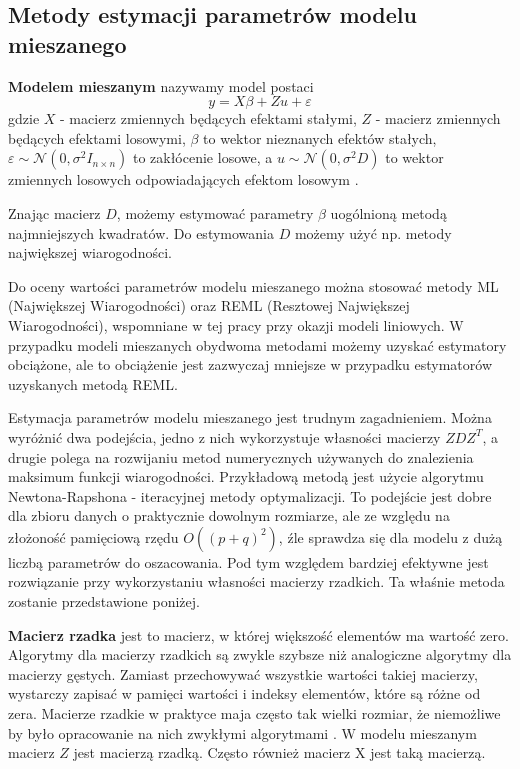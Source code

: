 \documentclass[12pt]{mwbk}
\theoremstyle{plain}
\theoremstyle{definition}
\theoremstyle{definition}
\begin{document}
\subsection{Metody estymacji parametrów modelu mieszanego}

\textbf{Modelem mieszanym} nazywamy model postaci
$$y=X\beta +Z u + \varepsilon$$
gdzie $X$ - macierz zmiennych będących efektami stałymi, $Z$ - macierz zmiennych będących efektami losowymi, $\beta$ to wektor nieznanych efektów stałych, $\varepsilon \sim \mathcal{N}(0, \sigma^2 I_{n\times n})$ to zakłócenie losowe, a $u \sim \mathcal{N} (0, \sigma^2D)$ to wektor zmiennych losowych odpowiadających efektom losowym \cite{biecek}.

Znając macierz $D$, możemy estymować parametry $\beta$ uogólnioną metodą najmniejszych kwadratów. Do estymowania $D$ możemy użyć np. metody największej wiarogodności.

Do oceny wartości parametrów modelu mieszanego można stosować metody ML (Największej Wiarogodności) oraz REML (Resztowej Największej Wiarogodności), wspomniane w tej pracy przy okazji modeli liniowych. W przypadku modeli mieszanych obydwoma metodami możemy uzyskać estymatory obciążone, ale to obciążenie jest zazwyczaj mniejsze w przypadku estymatorów uzyskanych metodą REML.


Estymacja parametrów modelu mieszanego jest trudnym zagadnieniem. Można wyróżnić dwa podejścia, jedno z nich wykorzystuje własności macierzy $ZDZ^T$, a drugie polega na rozwijaniu metod numerycznych używanych do znalezienia maksimum funkcji wiarogodności. Przykładową metodą jest użycie algorytmu Newtona-Rapshona - iteracyjnej metody optymalizacji. To podejście jest dobre dla zbioru danych o praktycznie dowolnym rozmiarze, ale ze względu na złożoność pamięciową rzędu $O((p+q)^2)$, źle sprawdza się dla modelu z dużą liczbą parametrów do oszacowania. Pod tym względem bardziej efektywne jest rozwiązanie przy wykorzystaniu własności macierzy rzadkich. Ta właśnie metoda zostanie przedstawione poniżej.

\textbf{Macierz rzadka} jest to macierz, w której większość elementów ma wartość zero. Algorytmy dla macierzy rzadkich są zwykle szybsze niż analogiczne algorytmy dla macierzy gęstych. Zamiast przechowywać wszystkie wartości takiej macierzy, wystarczy zapisać w pamięci wartości i indeksy elementów, które są różne od zera. Macierze rzadkie w praktyce maja często tak wielki rozmiar, że niemożliwe by było opracowanie na nich zwykłymi algorytmami \cite{rzadka}. W modelu mieszanym macierz $Z$ jest macierzą rzadką. Często również macierz X jest taką macierzą.
\end{document}
